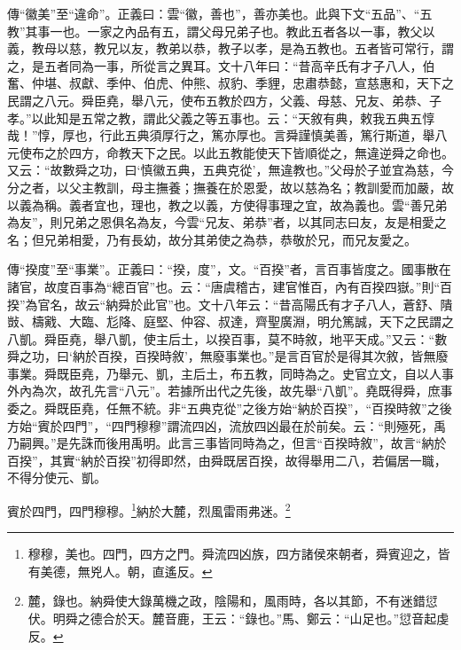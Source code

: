 {\noindent\zhuan{}\fzbyks 傳“徽美”至“違命”。正義曰：雲“徽，善也”，善亦美也。此與下文“五品”、“五教”其事一也。一家之內品有五，謂父母兄弟子也。教此五者各以一事，教父以義，教母以慈，教兄以友，教弟以恭，教子以孝，是為五教也。五者皆可常行，謂之，是五者同為一事，所從言之異耳。文十八年曰：“昔高辛氏有才子八人，伯奮、仲堪、叔獻、季仲、伯虎、仲熊、叔豹、季貍，忠肅恭懿，宣慈惠和，天下之民謂之八元。舜臣堯，舉八元，使布五教於四方，父義、母慈、兄友、弟恭、子孝。”以此知是五常之教，謂此父義之等五事也。云：“天敘有典，敕我五典五惇哉！”惇，厚也，行此五典須厚行之，篤亦厚也。言舜謹慎美善，篤行斯道，舉八元使布之於四方，命教天下之民。以此五教能使天下皆順從之，無違逆舜之命也。又云：“故數舜之功，曰‘慎徽五典，五典克從’，無違教也。”父母於子並宜為慈，今分之者，以父主教訓，母主撫養；撫養在於恩愛，故以慈為名；教訓愛而加嚴，故以義為稱。義者宜也，理也，教之以義，方使得事理之宜，故為義也。雲“善兄弟為友”，則兄弟之恩俱名為友，今雲“兄友、弟恭”者，以其同志曰友，友是相愛之名；但兄弟相愛，乃有長幼，故分其弟使之為恭，恭敬於兄，而兄友愛之。 \par}

{\noindent\zhuan{}\fzbyks 傳“揆度”至“事業”。正義曰：“揆，度”，文。“百揆”者，言百事皆度之。國事散在諸官，故度百事為“總百官”也。云：“唐虞稽古，建官惟百，內有百揆四嶽。”則“百揆”為官名，故云“納舜於此官”也。文十八年云：“昔高陽氏有才子八人，蒼舒、隤敱、檮戭、大臨、尨降、庭堅、仲容、叔達，齊聖廣淵，明允篤誠，天下之民謂之八凱。舜臣堯，舉八凱，使主后土，以揆百事，莫不時敘，地平天成。”又云：“數舜之功，曰‘納於百揆，百揆時敘’，無廢事業也。”是言百官於是得其次敘，皆無廢事業。舜既臣堯，乃舉元、凱，主后土，布五教，同時為之。史官立文，自以人事外內為次，故孔先言“八元”。若據所出代之先後，故先舉“八凱”。堯既得舜，庶事委之。舜既臣堯，任無不統。非“五典克從”之後方始“納於百揆”，“百揆時敘”之後方始“賓於四門”，“四門穆穆”謂流四凶，流放四凶最在於前矣。云：“則殛死，禹乃嗣興。”是先誅而後用禹明。此言三事皆同時為之，但言“百揆時敘”，故言“納於百揆”，其實“納於百揆”初得即然，由舜既居百揆，故得舉用二八，若偏居一職，不得分使元、凱。 \par}

賓於四門，四門穆穆。\footnote{穆穆，美也。四門，四方之門。舜流四凶族，四方諸侯來朝者，舜賓迎之，皆有美德，無兇人。朝，直遙反。}納於大麓，烈風雷雨弗迷。\footnote{麓，錄也。納舜使大錄萬機之政，陰陽和，風雨時，各以其節，不有迷錯愆伏。明舜之德合於天。麓音鹿，王云：“錄也。”馬、鄭云：“山足也。”愆音起虔反。}

